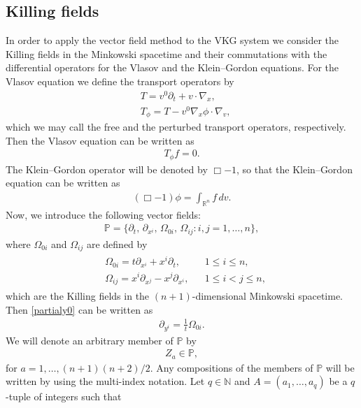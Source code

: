 \documentclass{article}
\newcommand{\bbr}{{\mathbb R}}
\newcommand{\bbn}{{\mathbb N}}
\newcommand{\bbp}{{\mathbb P}}
\begin{document}
%
\subsection{Killing fields} \label{sec Kf}
In order to apply the vector field method to the VKG system we consider the Killing fields in the Minkowski spacetime and their commutations with the differential operators for the Vlasov and the Klein--Gordon equations. For the Vlasov equation we define the transport operators by
\begin{align*}
& T = v^0 \partial_t + v \cdot \nabla_x , \\
& T_\phi = T - v^0 \nabla_x \phi \cdot \nabla_v ,
\end{align*}
which we may call the free and the perturbed transport operators, respectively. Then the Vlasov equation can be written as
\begin{align*}
T_\phi f = 0 .
\end{align*}
The Klein--Gordon operator will be denoted by $ \Box - 1 $, so that the Klein--Gordon equation can be written as
\begin{align*}
( \Box - 1 ) \phi = \int_{ \bbr^n } f \, d v .
\end{align*}
Now, we introduce the following vector fields:
\begin{align*}
\bbp = \{ \partial_t , \, \partial_{ x^i } , \, \Omega_{ 0 i } , \, \Omega_{ i j } : i , j = 1 , \dots , n \} ,
\end{align*}
where $ \Omega_{ 0 i } $ and $ \Omega_{ i j } $ are defined by
\begin{align*}
\begin{aligned}
& \Omega_{ 0 i } = t \partial_{ x^i } + x^i \partial_t , & & 1 \leq i \leq n , \\
& \Omega_{ i j } = x^i \partial_{ x^j } - x^j \partial_{ x^i } , & & 1 \leq i < j \leq n ,
\end{aligned}
\end{align*}
which are the Killing fields in the $ ( n + 1 ) $-dimensional Minkowski spacetime. Then \eqref{partialy0} can be written as
\begin{align}
\partial_{ y^i } = \frac{ 1 }{ t } \Omega_{ 0 i } . \label{partialy}
\end{align}
We will denote an arbitrary member of $ \bbp $ by
\begin{align*}
Z_a \in \bbp ,
\end{align*}
for $ a = 1 , \dots , ( n + 1 ) ( n + 2 ) / 2 $. Any compositions of the members of $ \bbp $ will be written by using the multi-index notation. Let $ q \in \bbn $ and $ A = ( a_1 , \dots , a_q ) $ be a $ q $-tuple of integers such that
\end{document}
